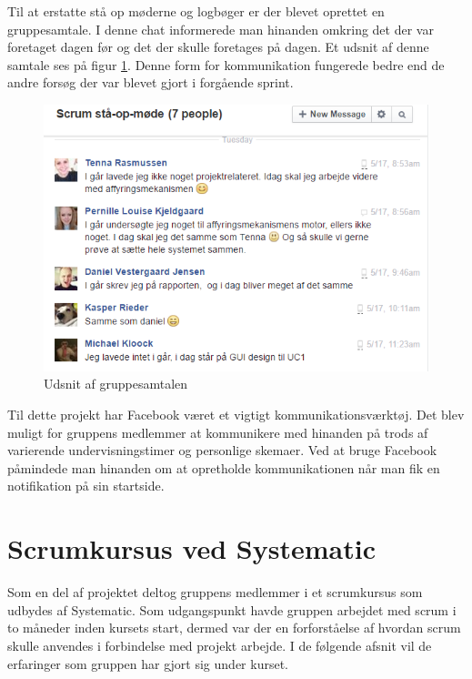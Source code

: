Til at erstatte stå op møderne og logbøger er der blevet oprettet en gruppesamtale. I denne chat informerede man hinanden omkring det der var foretaget dagen før og det der skulle foretages på dagen. Et udsnit af denne samtale ses på figur \ref{ref:fbchat}. Denne form for kommunikation fungerede bedre end de andre forsøg der var blevet gjort i forgående sprint. 

\begin{figure}[H]
	\centering
	\includegraphics[scale=0.6]{Projektgennemfoerelse/images/fbstandup}
	\caption{Udsnit af gruppesamtalen}
	\label{ref:fbchat}
\end{figure}

Til dette projekt har Facebook været et vigtigt kommunikationsværktøj. Det blev muligt for gruppens medlemmer at kommunikere med hinanden på trods af varierende undervisningstimer og personlige skemaer. Ved at bruge Facebook påmindede man hinanden om at opretholde kommunikationen når man fik en notifikation på sin startside.

\chapter{Scrumkursus ved Systematic}
Som en del af projektet deltog gruppens medlemmer i et scrumkursus som udbydes af Systematic. Som udgangspunkt havde gruppen arbejdet med scrum i to måneder inden kursets start, dermed var der en forforståelse af hvordan scrum skulle anvendes i forbindelse med projekt arbejde. I de følgende afsnit vil de erfaringer som gruppen har gjort sig under kurset.

